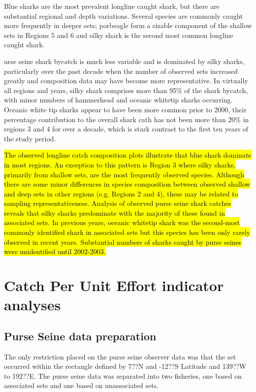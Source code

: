 \documentclass[12pt]{SCreport}
\begin{document}
Blue sharks are the most prevalent longline caught shark, but there are substantial regional and depth variations.  Several species are commonly caught more frequently in deeper sets; porbeagle form a sizable component of the shallow sets in Regions 5 and 6 and silky shark is the second most common longline caught shark.

urse seine shark bycatch is much less variable and is dominated by silky sharks, particularly over the past decade when the number of observed sets increased greatly and composition data may have become more representative.  In virtually all regions and years, silky shark comprises more than 95\% of the shark bycatch, with minor numbers of hammerhead and oceanic whitetip sharks occurring.  Oceanic white tip sharks appear to have been more common prior to 2000, their percentage contribution to the overall shark cath has not been more than 20\% in regions 3 and 4 for over a decade, which is stark contrast to the first ten years of the study period. 

 
\hl{ The observed longline catch composition plots illustrate that blue shark dominate in most regions. An exception to this pattern is Region 3 where silky sharks, primarily from shallow sets, are the most frequently observed species. Although there are some minor differences in species composition between observed shallow and deep sets in other regions (e.g. Regions 2 and 4), these may be related to sampling representativeness. Analysis of observed purse seine shark catches reveals that silky sharks predominate with the majority of these found in associated sets. In previous years, oceanic whitetip shark was the second-most commonly identified shark in associated sets but this species has been only rarely observed in recent years. Substantial numbers of sharks caught by purse seines were unidentified until 2002-2003.}
      
 \clearpage          

\section{Catch Per Unit Effort indicator analyses}


\subsection*{Purse Seine data preparation}
The only restriction placed on the purse seine observer data was that the set occurred within the rectangle defined by 7??N and -12??S Latitude and 139??W to 192??E. The purse seine data was separated into two fisheries, one based on associated sets and one based on unassociated sets.
\end{document}
